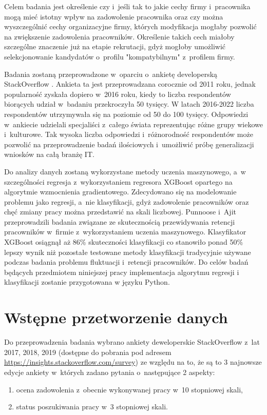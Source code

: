 Celem badania jest określenie czy i~jeśli tak to jakie cechy firmy i~pracownika mogą mieć istotny wpływ na zadowolenie pracownika
oraz czy można wyszczególnić cechy organizacyjne firmy, których modyfikacja mogłaby pozwolić na zwiększenie zadowolenia pracowników.
Określenie takich cech miałoby szczególne znaczenie już na etapie rekrutacji, gdyż mogłoby umożliwić selekcjonowanie kandydatów o~profilu "kompatybilnym" z~profilem firmy.


Badania zostaną przeprowadzone w~oparciu o~ankietę developerską StackOverflow \cite{so-survey-info}.
Ankieta ta jest przeprowadzana corocznie od 2011 roku, jednak popularność zyskała dopiero w~2016 roku, kiedy to liczba respondentów biorących udział w~badaniu przekroczyła 50 tysięcy.
W latach 2016-2022 liczba respondentów utrzymywała się na poziomie od 50 do 100 tysięcy.
Odpowiedzi w~ankiecie udzielali specjaliści z~całego świata reprezentując różne grupy wiekowe i~kulturowe.
Tak wysoka liczba odpowiedzi i~różnorodność respondentów może pozwolić na przeprowadzenie badań ilościowych i~umożliwić próbę generalizacji wniosków na całą branżę IT.


Do analizy danych zostaną wykorzystane metody uczenia maszynowego, a~w szczególności regresja z~wykorzystaniem regresora XGBoost opartego na algorytmie wzmocnienia gradientowego.
Zdecydowano się na modelowanie problemu jako regresji, a~nie klasyfikacji, gdyż zadowolenie pracowników oraz chęć zmiany pracy można przedstawić na skali liczbowej.
Punnoose i~Ajit \cite{punnoose-2016} przeprowadzili badania związane ze skutecznością przewidywania retencji pracowników w~firmie z~wykorzystaniem uczenia maszynowego.
Klasyfikator XGBoost osiągnął aż 86\% skuteczności klasyfikacji co stanowiło ponad 50\% lepszy wynik niż pozostałe testowane metody klasyfikacji tradycyjnie używane podczas badania problemu fluktuacji i~retencji pracowników.
Do celów badań będących przedmiotem niniejszej pracy implementacja algorytmu regresji i klasyfikacji zostanie przygotowana w języku Python.


\section{Wstępne przetworzenie danych}\label{sec:analysis:preprocessing}
Do przeprowadzenia badania wybrano ankiety deweloperskie StackOverflow z~lat 2017, 2018, 2019 (dostępne do pobrania pod adresem \url{https://insights.stackoverflow.com/survey}) ze względu na to, że są to 3 najnowsze edycje ankiety w~których zadano pytania o~następujące 2 aspekty:
\begin{enumerate}
    \item ocena zadowolenia z~obecnie wykonywanej pracy w~10 stopniowej skali,
    \item status poszukiwania pracy w~3 stopniowej skali.
\end{enumerate}

